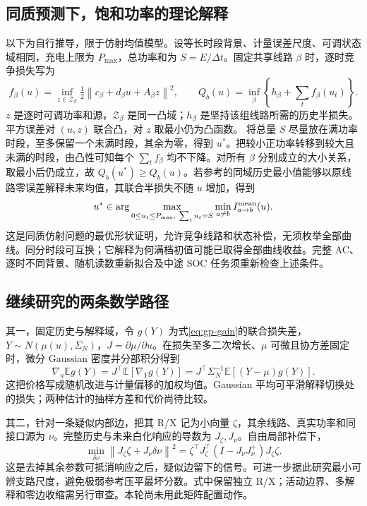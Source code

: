 \documentclass[UTF8,fontset=fandol,11pt,a4paper]{ctexart}
\newcommand{\norm}[1]{\left\lVert#1\right\rVert}
\begin{document}
\subsection{同质预测下，饱和功率的理论解释}
以下为自行推导，限于仿射均值模型。设等长时段背景、计量误差尺度、可调状态域相同，充电上限为 $P_{\max}$，总功率和为 $S=E/\Delta t$。固定共享线路 $\beta$ 时，逐时竞争损失写为
\begin{equation}
f_\beta(u)=\inf_{z\in\mathcal Z_\beta}\tfrac12\norm{c_\beta+d_\beta u+A_\beta z}^2,
\qquad Q_b(u)=\inf_\beta\left\{h_\beta+\sum_t f_\beta(u_t)\right\}.
\label{eq:gp-stationary}
\end{equation}
$z$ 是逐时可调功率和源，$\mathcal Z_\beta$ 是同一凸域；$h_\beta$ 是坚持该组线路所需的历史半损失。平方误差对 $(u,z)$ 联合凸，对 $z$ 取最小仍为凸函数。
将总量 $S$ 尽量放在满功率时段，至多保留一个未满时段，其余为零，得到 $u^*$。把较小正功率转移到较大且未满的时段，由凸性可知每个 $\sum_t f_\beta$ 均不下降。对所有 $\beta$ 分别成立的大小关系，取最小后仍成立，故 $Q_b(u^*)\ge Q_b(u)$。若参考的同域历史最小值能够以原线路零误差解释未来均值，其联合半损失不随 $u$ 增加，得到
\begin{equation}
u^*\in\arg\max_{0\le u_t\le P_{\max},\ \sum_tu_t=S}
\min_{a\ne b}I_{a\to b}^{\rm mean}(u).
\label{eq:gp-saturated}
\end{equation}
这是同质仿射问题的最优形状证明，允许竞争线路和状态补偿，无须枚举全部曲线。同分时段可互换；它解释为何满档初值可能已取得全部曲线收益。完整 AC、逐时不同背景、随机读数重新拟合及中途 SOC 任务须重新检查上述条件。

\subsection{继续研究的两条数学路径}
其一，固定历史与解释域，令 $g(Y)$ 为式\eqref{eq:gp-gain}的联合损失差，$Y\sim N(\mu(u),\Sigma_N)$，$J=\partial\mu/\partial u$。在损失至多二次增长、$\mu$ 可微且协方差固定时，微分 Gaussian 密度并分部积分得到
\begin{equation}
\nabla_u\mathbb E g(Y)=J^\top\mathbb E[\nabla_Yg(Y)]
=J^\top\Sigma_N^{-1}\mathbb E[(Y-\mu)g(Y)].
\label{eq:gp-score}
\end{equation}
这把价格写成随机改进与计量偏移的加权均值。Gaussian 平均可平滑解释切换处的损失；两种估计的抽样方差和代价尚待比较。

其二，针对一条疑似内部边，把其 R/X 记为小向量 $\zeta$，其余线路、真实功率和同接口源为 $\nu$。完整历史与未来白化响应的导数为 $J_\zeta,J_\nu$。自由局部补偿下，
\begin{equation}
\min_{\delta\nu}\norm{J_\zeta\zeta+J_\nu\delta\nu}^2
=\zeta^\top J_\zeta^\top(I-J_\nu J_\nu^+)J_\zeta\zeta.
\label{eq:gp-weak-information}
\end{equation}
这是去掉其余参数可抵消响应之后，疑似边留下的信号。可进一步据此研究最小可辨支路尺度，避免极弱参考压平最坏分数。式中保留独立 R/X；活动边界、多解释和零边收缩需另行审查。本轮尚未用此矩阵配置动作。
\end{document}
